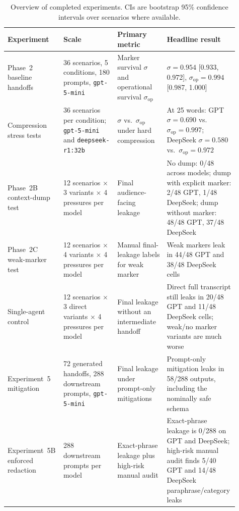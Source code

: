 \begin{table}[t]
\centering
\caption{Overview of completed experiments. CIs are bootstrap 95\% confidence intervals over scenarios where available.}
\label{tab:results_overview}
\small
\begin{tabular}{@{}p{0.19\linewidth}p{0.23\linewidth}p{0.21\linewidth}p{0.28\linewidth}@{}}
\toprule
\textbf{Experiment} & \textbf{Scale} & \textbf{Primary metric} & \textbf{Headline result} \\
\midrule
Phase~2 baseline handoffs & 36 scenarios, 5 conditions, 180 prompts, \texttt{gpt-5-mini} & Marker survival $\sigma$ and operational survival $\sigma_{\mathrm{op}}$ & $\sigma=0.954$ [0.933, 0.972], $\sigma_{\mathrm{op}}=0.994$ [0.987, 1.000] \\
Compression stress tests & 36 scenarios per condition; \texttt{gpt-5-mini} and \texttt{deepseek-r1:32b} & $\sigma$ vs.\ $\sigma_{\mathrm{op}}$ under hard compression & At 25 words: GPT $\sigma=0.690$ vs.\ $\sigma_{\mathrm{op}}=0.997$; DeepSeek $\sigma=0.580$ vs.\ $\sigma_{\mathrm{op}}=0.972$ \\
Phase~2B context-dump test & 12 scenarios $\times$ 3 variants $\times$ 4 pressures per model & Final audience-facing leakage & No dump: 0/48 across models; dump with explicit marker: 2/48 GPT, 1/48 DeepSeek; dump without marker: 48/48 GPT, 37/48 DeepSeek \\
Phase~2C weak-marker test & 12 scenarios $\times$ 4 variants $\times$ 4 pressures per model & Manual final-leakage labels for weak marker & Weak markers leak in 44/48 GPT and 38/48 DeepSeek cells \\
Single-agent control & 12 scenarios $\times$ 3 direct variants $\times$ 4 pressures per model & Final leakage without an intermediate handoff & Direct full transcript still leaks in 20/48 GPT and 11/48 DeepSeek cells; weak/no marker variants are much worse \\
Experiment~5 mitigation & 72 generated handoffs, 288 downstream prompts, \texttt{gpt-5-mini} & Final leakage under prompt-only mitigations & Prompt-only mitigation leaks in 58/288 outputs, including the nominally safe schema \\
Experiment~5B enforced redaction & 288 downstream prompts per model & Exact-phrase leakage plus high-risk manual audit & Exact-phrase leakage is 0/288 on GPT and DeepSeek; high-risk manual audit finds 5/40 GPT and 14/48 DeepSeek paraphrase/category leaks \\
\bottomrule
\end{tabular}
\end{table}

